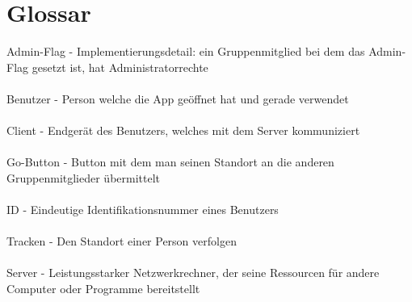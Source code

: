 \section{Glossar}
Admin-Flag - Implementierungsdetail: ein Gruppenmitglied bei dem das Admin-Flag gesetzt ist, hat Administratorrechte\\
\\
Benutzer - Person welche die App geöffnet hat und gerade verwendet\\
\\
Client - Endgerät des Benutzers, welches mit dem Server kommuniziert\\
\\
Go-Button - Button mit dem man seinen Standort an die anderen Gruppenmitglieder übermittelt\\
\\
ID - Eindeutige Identifikationsnummer eines Benutzers\\
\\
Tracken - Den Standort einer Person verfolgen\\
\\
Server - Leistungsstarker Netzwerkrechner, der seine Ressourcen für andere Computer oder Programme bereitstellt

